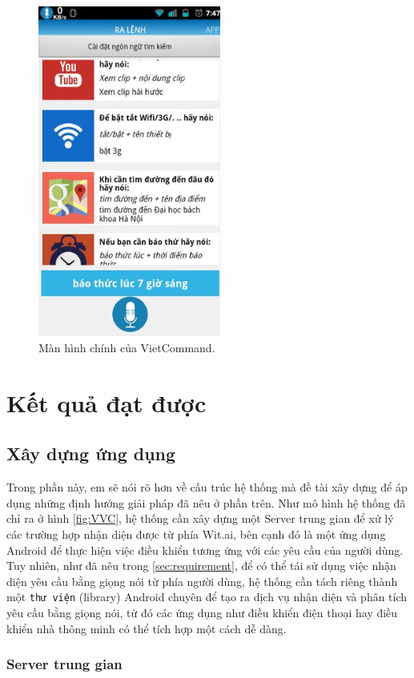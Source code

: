 \documentclass[12pt]{report}
\begin{document}
\begin{figure}[H]
	\centering
	\includegraphics[width=6cm]{Pics/Chap5/vietcommand.jpg}
	\caption{Màn hình chính của VietCommand.}
\end{figure}
\chapter{Kết quả đạt được}

\section{Xây dựng ứng dụng}

Trong phần này, em sẽ nói rõ hơn về cấu trúc hệ thống mà đề tài xây dựng để áp dụng những định hướng giải pháp đã nêu ở phần trên. Như mô hình hệ thống đã chỉ ra ở hình \ref{fig:VVC}, hệ thống cần xây dựng một Server trung gian để xử lý các trường hợp nhận diện được từ phía Wit.ai, bên cạnh đó là một ứng dụng Android để thực hiện việc điều khiển tương ứng với các yêu cầu của người dùng. Tuy nhiên, như đã nêu trong \ref{sec:requirement}, để có thể tái sử dụng việc nhận diện yêu cầu bằng giọng nói từ phía người dùng, hệ thống cần tách riêng thành một \texttt{thư viện} (library) Android chuyên để tạo ra dịch vụ nhận diện và phân tích yêu cầu bằng giọng nói, từ đó các ứng dụng như điều khiển điện thoại hay điều khiển nhà thông minh có thể tích hợp một cách dễ dàng.

\subsection{Server trung gian}
\end{document}
